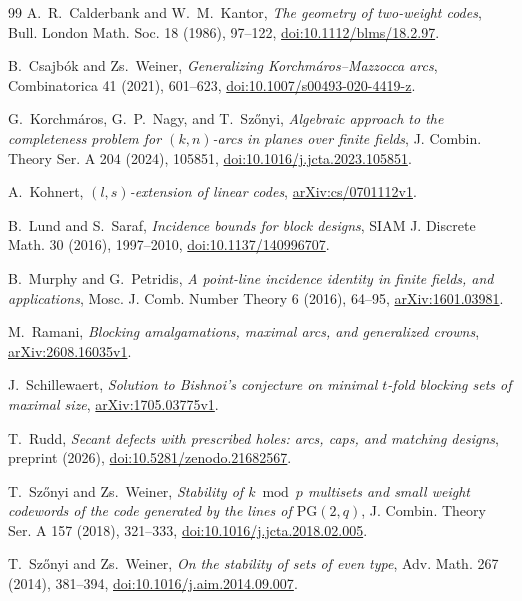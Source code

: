 \documentclass[11pt]{article}
\numberwithin{equation}{section}
\theoremstyle{definition}
\theoremstyle{remark}
\newcommand{\PG}{\mathrm{PG}}
\begin{document}
\begin{thebibliography}{99}
A.~R.~Calderbank and W.~M.~Kantor,
\emph{The geometry of two-weight codes}, Bull. London Math. Soc. 18 (1986),
97--122,
\href{https://doi.org/10.1112/blms/18.2.97}{doi:10.1112/blms/18.2.97}.

B.~Csajb\'ok and Zs.~Weiner,
\emph{Generalizing Korchm\'aros--Mazzocca arcs}, Combinatorica 41 (2021),
601--623,
\href{https://doi.org/10.1007/s00493-020-4419-z}{doi:10.1007/s00493-020-4419-z}.

G.~Korchm\'aros, G.~P.~Nagy, and T.~Sz\H{o}nyi,
\emph{Algebraic approach to the completeness problem for \((k,n)\)-arcs in
planes over finite fields}, J. Combin. Theory Ser. A 204 (2024), 105851,
\href{https://doi.org/10.1016/j.jcta.2023.105851}{doi:10.1016/j.jcta.2023.105851}.

A.~Kohnert,
\emph{\((l,s)\)-extension of linear codes},
\href{https://arxiv.org/abs/cs/0701112}{arXiv:cs/0701112v1}.

B.~Lund and S.~Saraf,
\emph{Incidence bounds for block designs}, SIAM J. Discrete Math. 30 (2016),
1997--2010,
\href{https://doi.org/10.1137/140996707}{doi:10.1137/140996707}.

B.~Murphy and G.~Petridis,
\emph{A point-line incidence identity in finite fields, and applications},
Mosc. J. Comb. Number Theory 6 (2016), 64--95,
\href{https://arxiv.org/abs/1601.03981}{arXiv:1601.03981}.

M.~Ramani,
\emph{Blocking amalgamations, maximal arcs, and generalized crowns},
\href{https://arxiv.org/abs/2608.16035}{arXiv:2608.16035v1}.

J.~Schillewaert,
\emph{Solution to Bishnoi's conjecture on minimal \(t\)-fold blocking sets of
maximal size},
\href{https://arxiv.org/abs/1705.03775}{arXiv:1705.03775v1}.

T.~Rudd,
\emph{Secant defects with prescribed holes: arcs, caps, and matching
designs}, preprint (2026),
\href{https://doi.org/10.5281/zenodo.21682567}{doi:10.5281/zenodo.21682567}.

T.~Sz\H{o}nyi and Zs.~Weiner,
\emph{Stability of \(k\bmod p\) multisets and small weight codewords of the
code generated by the lines of \(\PG(2,q)\)}, J. Combin. Theory Ser. A 157
(2018), 321--333,
\href{https://doi.org/10.1016/j.jcta.2018.02.005}{doi:10.1016/j.jcta.2018.02.005}.

T.~Sz\H{o}nyi and Zs.~Weiner,
\emph{On the stability of sets of even type}, Adv. Math. 267 (2014), 381--394,
\href{https://doi.org/10.1016/j.aim.2014.09.007}{doi:10.1016/j.aim.2014.09.007}.

\end{thebibliography}
\end{document}
